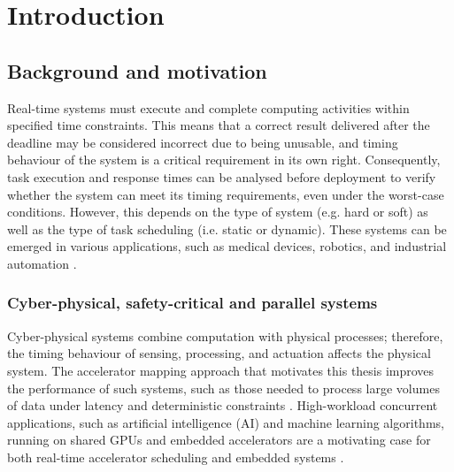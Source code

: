 % 
\chapter{Introduction} %
\label{chap:Chapter1} %


\section{Background and motivation}
\label{sec:chap1_background}

Real-time systems must execute and complete computing activities within specified time constraints. This means that a correct result delivered after the deadline may be considered incorrect due to being unusable, and timing behaviour of the system is a critical requirement in its own right. Consequently, task execution and response times can be analysed before deployment to verify whether the system can meet its timing requirements, even under the worst-case conditions. However, this depends on the type of system (e.g. hard or soft) as well as the type of task scheduling (i.e. static or dynamic). These systems can be emerged in various applications, such as medical devices, robotics, and industrial automation \parencite{singh2017survey,li2020hybrid,gharajeh2022configuration}.

\subsection{Cyber-physical, safety-critical and parallel systems}
\label{sec:chap1_cps}

Cyber-physical systems combine computation with physical processes; therefore, the timing behaviour of sensing, processing, and actuation affects the physical system. The accelerator mapping approach that motivates this thesis improves the performance of such systems, such as those needed to process large volumes of data under latency and deterministic constraints \parencite{Samadi2026Accelerator}. High-workload concurrent applications, such as artificial intelligence (AI) and machine learning algorithms, running on shared GPUs and embedded accelerators are a motivating case for both real-time accelerator scheduling \parencite{Zou2023RTGPU} and embedded systems \parencite{Dagli2024HaXCoNN}.

